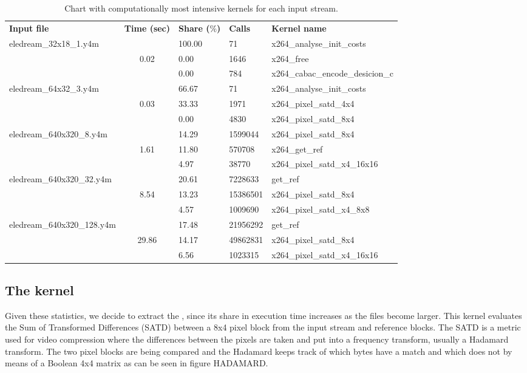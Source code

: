 \begin{table}[htb]%
\centering
\small
	\begin{tabular}{lclll}
		\centering
		\bf{Input file} & \bf{Time (sec)} 	& \bf{Share ($\%$)} & \bf{Calls}	& \bf{Kernel name} \\ \cline{1-4}
		\multirow{3}{*}{eledream\_32x18\_1.y4m}	&				& 100.00	& 71		&	x264\_analyse\_init\_costs\\ 
																						&	0.02	& 0.00 		& 1646	&	x264\_free\\ 
																						&				& 0.00		& 784		&	x264\_cabac\_encode\_desicion\_c\\ \cline{1-5}
		\multirow{3}{*}{eledream\_64x32\_3.y4m} & 			& 66.67		& 71		& x264\_analyse\_init\_costs\\
																						&	0.03	& 33.33 	& 1971	&	x264\_pixel\_satd\_4x4\\ 
																						&				& 0.00		& 4830	&	x264\_pixel\_satd\_8x4\\ \cline{1-5}
		\multirow{3}{*}{eledream\_640x320\_8.y4m}	& 			& 14.29	& 1599044		&	x264\_pixel\_satd\_8x4\\ 
																							&	1.61	& 11.80 	& 570708	&	x264\_get\_ref\\ 
																							&				& 4.97		& 38770		&	x264\_pixel\_satd\_x4\_16x16\\ \cline{1-5}
		\multirow{3}{*}{eledream\_640x320\_32.y4m}& 			& 20.61		& 7228633		&	get\_ref\\ 
																							& 8.54	& 13.23 	& 15386501	&	x264\_pixel\_satd\_8x4\\ 
																							&				& 4.57		& 1009690		&	x264\_pixel\_satd\_x4\_8x8\\ \cline{1-5}
		\multirow{3}{*}{eledream\_640x320\_128.y4m}&			& 17.48		& 21956292	&	get\_ref\\
																							&	 29.86& 14.17 	& 49862831	&	x264\_pixel\_satd\_8x4\\
																							&				& 6.56		& 1023315		&	x264\_pixel\_satd\_x4\_16x16\\ \cline{1-5}
	\end{tabular}	
\caption{Chart with computationally most intensive kernels for each input stream.}
\label{tab:chart}
\end{table}

\subsection{The  kernel}
\label{sec:kernel}
Given these statistics, we decide to extract the , since its share in execution time increases as the files become larger. This kernel evaluates the Sum of Transformed Differences (SATD) between a 8x4 pixel block from the input stream and reference blocks. The SATD is a metric used for video compression where the differences between the pixels are taken and put into a frequency transform, usually a Hadamard transform. The two pixel blocks are being compared and the Hadamard keeps track of which bytes have a match and which does not by means of a Boolean 4x4 matrix as can be seen in figure HADAMARD.

